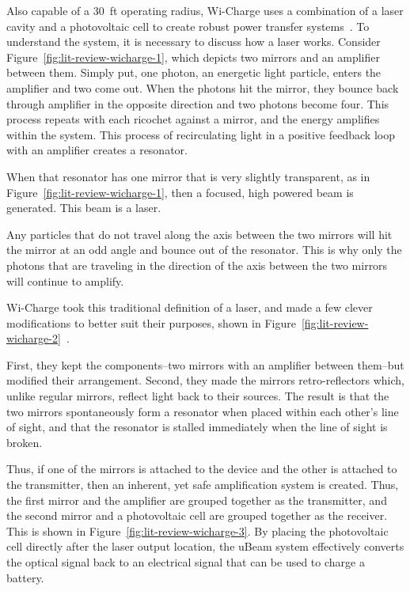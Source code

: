 Also capable of a 30~ft operating radius, Wi-Charge uses a combination of a laser cavity and a photovoltaic cell to create robust power transfer systems~\cite{wicharge2016}. To understand the system, it is necessary to discuss how a laser works. Consider Figure~\ref{fig:lit-review-wicharge-1}, which depicts two mirrors and an amplifier between them. Simply put, one photon, an energetic light particle, enters the amplifier and two come out. When the photons hit the mirror, they bounce back through amplifier in the opposite direction and two photons become four. This process repeats with each ricochet against a mirror, and the energy amplifies within the system. This process of recirculating light in a positive feedback loop with an amplifier creates a resonator.

When that resonator has one mirror that is very slightly transparent, as in Figure~\ref{fig:lit-review-wicharge-1}, then a focused, high powered beam is generated. This beam is a laser.

Any particles that do not travel along the axis between the two mirrors will hit the mirror at an odd angle and bounce out of the resonator. This is why only the photons that are traveling in the direction of the axis between the two mirrors will continue to amplify.

Wi-Charge took this traditional definition of a laser, and made a few clever modifications to better suit their purposes, shown in Figure~\ref{fig:lit-review-wicharge-2}~\cite{wicharge2016}.

First, they kept the components--two mirrors with an amplifier between them--but modified their arrangement. Second, they made the mirrors retro-reflectors which, unlike regular mirrors, reflect light back to their sources. The result is that the two mirrors spontaneously form a resonator when placed within each other's line of sight, and that the resonator is stalled immediately when the line of sight is broken.

Thus, if one of the mirrors is attached to the device and the other is attached to the transmitter, then an inherent, yet safe amplification system is created. Thus, the first mirror and the amplifier are grouped together as the transmitter, and the second mirror and a photovoltaic cell are grouped together as the receiver. This is shown in Figure~\ref{fig:lit-review-wicharge-3}. By placing the photovoltaic cell directly after the laser output location, the uBeam system effectively converts the optical signal back to an electrical signal that can be used to charge a battery.

